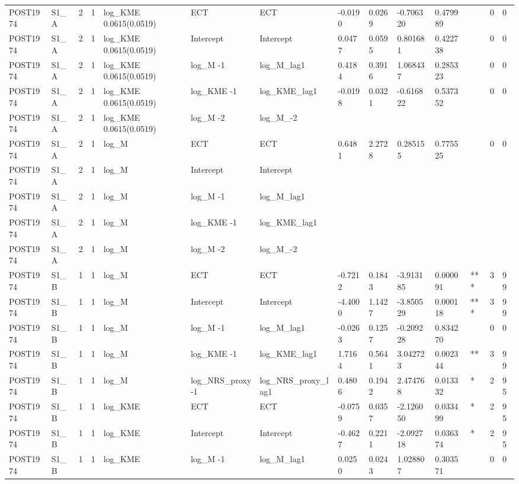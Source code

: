 \begin{tabular}{llllllllllllll}
POST1974 & S1\_A & 2 & 1 & log\_KME 0.0615(0.0519) & ECT & ECT & -0.0190 & 0.0269 & -0.706320 & 0.479989 &  & 0 & 0 \\
POST1974 & S1\_A & 2 & 1 & log\_KME 0.0615(0.0519) & Intercept & Intercept & 0.0477 & 0.0595 & 0.801681 & 0.422738 &  & 0 & 0 \\
POST1974 & S1\_A & 2 & 1 & log\_KME 0.0615(0.0519) & log\_M -1 & log\_M\_lag1 & 0.4184 & 0.3916 & 1.068437 & 0.285323 &  & 0 & 0 \\
POST1974 & S1\_A & 2 & 1 & log\_KME 0.0615(0.0519) & log\_KME -1 & log\_KME\_lag1 & -0.0198 & 0.0321 & -0.616822 & 0.537352 &  & 0 & 0 \\
POST1974 & S1\_A & 2 & 1 & log\_KME 0.0615(0.0519) & log\_M -2 & log\_M\_-2 &  &  &  &  &  &  &  \\
POST1974 & S1\_A & 2 & 1 & log\_M & ECT & ECT & 0.6481 & 2.2728 & 0.285155 & 0.775525 &  & 0 & 0 \\
POST1974 & S1\_A & 2 & 1 & log\_M & Intercept & Intercept &  &  &  &  &  &  &  \\
POST1974 & S1\_A & 2 & 1 & log\_M & log\_M -1 & log\_M\_lag1 &  &  &  &  &  &  &  \\
POST1974 & S1\_A & 2 & 1 & log\_M & log\_KME -1 & log\_KME\_lag1 &  &  &  &  &  &  &  \\
POST1974 & S1\_A & 2 & 1 & log\_M & log\_M -2 & log\_M\_-2 &  &  &  &  &  &  &  \\
POST1974 & S1\_B & 1 & 1 & log\_M & ECT & ECT & -0.7212 & 0.1843 & -3.913185 & 0.000091 & *** & 3 & 99 \\
POST1974 & S1\_B & 1 & 1 & log\_M & Intercept & Intercept & -4.4000 & 1.1427 & -3.850529 & 0.000118 & *** & 3 & 99 \\
POST1974 & S1\_B & 1 & 1 & log\_M & log\_M -1 & log\_M\_lag1 & -0.0263 & 0.1257 & -0.209228 & 0.834270 &  & 0 & 0 \\
POST1974 & S1\_B & 1 & 1 & log\_M & log\_KME -1 & log\_KME\_lag1 & 1.7164 & 0.5641 & 3.042723 & 0.002344 & ** & 3 & 99 \\
POST1974 & S1\_B & 1 & 1 & log\_M & log\_NRS\_proxy -1 & log\_NRS\_proxy\_lag1 & 0.4806 & 0.1942 & 2.474768 & 0.013332 & * & 2 & 95 \\
POST1974 & S1\_B & 1 & 1 & log\_KME & ECT & ECT & -0.0759 & 0.0357 & -2.126050 & 0.033499 & * & 2 & 95 \\
POST1974 & S1\_B & 1 & 1 & log\_KME & Intercept & Intercept & -0.4627 & 0.2211 & -2.092718 & 0.036374 & * & 2 & 95 \\
POST1974 & S1\_B & 1 & 1 & log\_KME & log\_M -1 & log\_M\_lag1 & 0.0250 & 0.0243 & 1.028807 & 0.303571 &  & 0 & 0 \\

\end{tabular}
